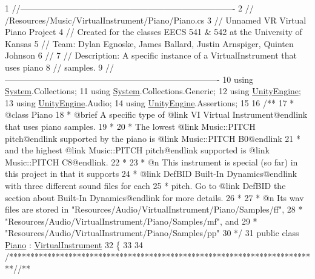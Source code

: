 \begin{DoxyCodeInclude}
1 \textcolor{comment}{//---------------------------------------------------------------------------- }
2 \textcolor{comment}{// /Resources/Music/VirtualInstrument/Piano/Piano.cs}
3 \textcolor{comment}{// Unnamed VR Virtual Piano Project }
4 \textcolor{comment}{// Created for the classes EECS 541 & 542 at the University of Kansas}
5 \textcolor{comment}{// Team: Dylan Egnoske, James Ballard, Justin Arnspiger, Quinten Johnson }
6 \textcolor{comment}{// }
7 \textcolor{comment}{// Description: A specific instance of a VirtualInstrument that uses piano}
8 \textcolor{comment}{//              samples. }
9 \textcolor{comment}{//----------------------------------------------------------------------------}
10 \textcolor{keyword}{using} \hyperlink{namespace_system}{System}.Collections;
11 \textcolor{keyword}{using} \hyperlink{namespace_system}{System}.Collections.Generic;
12 \textcolor{keyword}{using} \hyperlink{namespace_unity_engine}{UnityEngine};
13 \textcolor{keyword}{using} \hyperlink{namespace_unity_engine}{UnityEngine}.Audio;
14 \textcolor{keyword}{using} \hyperlink{namespace_unity_engine}{UnityEngine}.Assertions;
15 \textcolor{comment}{}
16 \textcolor{comment}{/**}
17 \textcolor{comment}{ * @class Piano}
18 \textcolor{comment}{ * @brief A specific type of @link VI Virtual Instrument@endlink that uses piano samples. }
19 \textcolor{comment}{ * }
20 \textcolor{comment}{ * The lowest @link Music::PITCH pitch@endlink supported by the piano is @link Music::PITCH B0@endlink}
21 \textcolor{comment}{ * and the highest @link Music::PITCH pitch@endlink supported is @link Music::PITCH C8@endlink. }
22 \textcolor{comment}{ * }
23 \textcolor{comment}{ * @n This instrument is special (so far) in this project in that it supports }
24 \textcolor{comment}{ * @link DefBID Built-In Dynamics@endlink with three different sound files for each}
25 \textcolor{comment}{ * pitch. Go to @link DefBID the section about Built-In Dynamics@endlink for more details.}
26 \textcolor{comment}{ * }
27 \textcolor{comment}{ * @n Its wav files are stored in "Resources/Audio/VirtualInstrument/Piano/Samples/ff",}
28 \textcolor{comment}{ *  "Resources/Audio/VirtualInstrument/Piano/Samples/mf", and }
29 \textcolor{comment}{ *  "Resources/Audio/VirtualInstrument/Piano/Samples/pp"}
30 \textcolor{comment}{*/}
31 \textcolor{keyword}{public} \textcolor{keyword}{class }\hyperlink{class_piano}{Piano} : \hyperlink{class_virtual_instrument}{VirtualInstrument}
32 \{
33 
34     \textcolor{comment}{/*************************************************************************/}\textcolor{comment}{/** }

\end{DoxyCodeInclude}
